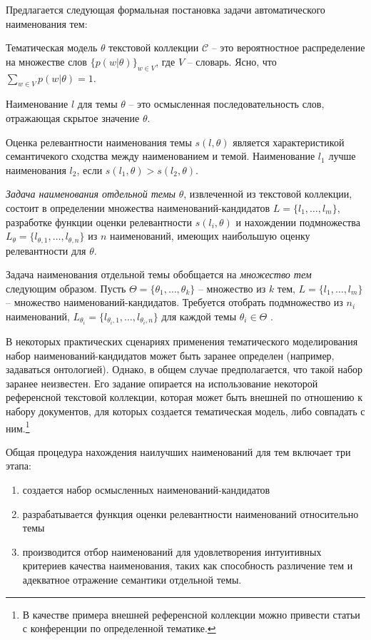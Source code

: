Предлагается следующая формальная постановка задачи автоматического наименования тем:

Тематическая модель $\theta$ текстовой коллекции $\mathcal{C}$ -- это вероятностное распределение на множестве слов $\{p(w|\theta)\}_{w \in V}$, где $V$ -- словарь. Ясно, что $\sum_{w \in V}p(w|\theta) = 1$.

Наименование $l$ для темы $\theta$ -- это осмысленная последовательность слов, отражающая скрытое значение $\theta$.

Оценка релевантности наименования темы $s(l, \theta)$ является характеристикой семантичекого сходства между наименованием и темой. Наименование $l_1$ лучше наименования $l_2$, если $s(l_1, \theta) > s(l_2, \theta)$.

\textit{Задача наименования отдельной темы} $\theta$, извлеченной из текстовой коллекции, состоит в определении множества наименований-кандидатов $L = \{l_1, \ldots, l_m\}$, разработке функции оценки релевантности $s(l_i, \theta)$ и нахождении подмножества $L_\theta = \{l_{\theta, 1}, \ldots, l_{\theta, n}\}$ из $n$ наименований, имеющих наибольшую оценку релевантности  для $\theta$.

Задача наименования отдельной темы обобщается на \textit{множество тем} следующим образом. Пусть $\Theta = \{\theta_1, \ldots, \theta_k\}$ -- множество из $k$ тем, $L = \{l_1, \ldots, l_m\}$ -- множество наименований-кандидатов. Требуется отобрать подмножество из $n_i$ наименований, $L_{\theta_i} = \{l_{\theta_i, 1}, \ldots, l_{\theta_i, n}\}$ для каждой темы $\theta_i \in \Theta$ .

В некоторых практических сценариях применения тематического моделирования набор наименований-кандидатов может быть заранее определен (например, задаваться онтологией). Однако, в общем случае предполагается, что такой набор заранее неизвестен. Его задание опирается на использование некоторой референсной текстовой коллекции, которая может быть внешней по отношению к набору документов, для которых создается тематическая модель, либо совпадать с ним.\footnote{В качестве примера внешней референсной коллекции можно привести статьи с конференции по определенной тематике.}

Общая процедура нахождения наилучших наименований для тем включает три этапа:
\begin{enumerate}
    \item создается набор осмысленных наименований-кандидатов 
    \item разрабатывается функция оценки релевантности наименований относительно темы
    \item производится отбор наименований для удовлетворения интуитивных критериев качества наименования, таких как способность различение тем и адекватное отражение семантики отдельной темы. 
\end{enumerate}

